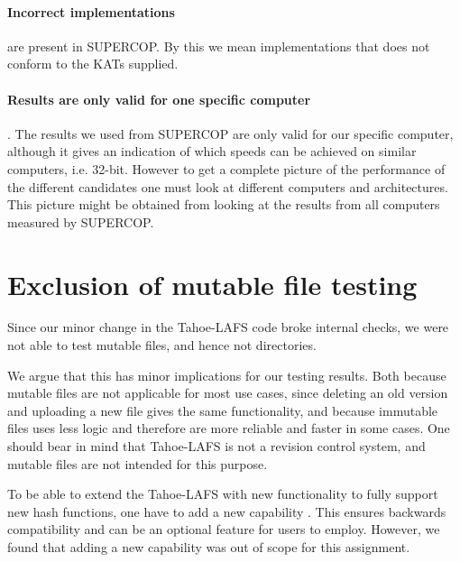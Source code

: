 \documentclass[english,12pt,a4paper]{book}
\begin{document}
\paragraph{Incorrect implementations} are present in \ac{SUPERCOP}. By this we
mean implementations that does not conform to the \ac{KAT}s supplied.

\paragraph{Results are only valid for one specific computer}. The results we
used from \ac{SUPERCOP} are only valid for our specific computer, although it
gives an indication of which speeds can be achieved on similar computers, i.e.
32-bit. However to get a complete picture of the performance of the different
candidates one must look at different computers and architectures. This picture
might be obtained from looking at the results from all computers measured by
\ac{SUPERCOP}.

\section{Exclusion of mutable file testing}

Since our minor change in the Tahoe-\ac{LAFS} code broke internal checks, we
were not able to test mutable files, and hence not directories.

We argue that this has minor implications for our testing results. Both because
mutable files are not applicable for most use cases, since deleting an old
version and uploading a new file gives the same functionality, and because
immutable files uses less logic and therefore are more reliable and faster in
some cases. One should bear in mind that Tahoe-\ac{LAFS} is not a revision
control system, and mutable files are not intended for this purpose.

To be able to extend the Tahoe-LAFS with new functionality to fully support new
hash functions, one have to add a new capability \cite{t_zooko}. This ensures
backwards compatibility and can be an optional feature for users to employ.
However, we found that adding a new capability was out of scope for this
assignment.

%
%
%
\end{document}
